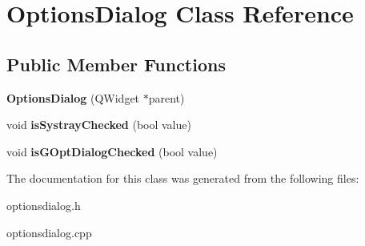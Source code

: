 \hypertarget{classOptionsDialog}{
\section{OptionsDialog Class Reference}
\label{classOptionsDialog}
}
\subsection*{Public Member Functions}
\begin{DoxyCompactItemize}
\item 
\hypertarget{classOptionsDialog_a8131b615e29560144ffb368b9b07060a}{
{\bfseries OptionsDialog} (QWidget $\ast$parent)}
\label{classOptionsDialog_a8131b615e29560144ffb368b9b07060a}

\item 
\hypertarget{classOptionsDialog_af5765aa8cdf4e15439c63e3e746772fb}{
void {\bfseries isSystrayChecked} (bool value)}
\label{classOptionsDialog_af5765aa8cdf4e15439c63e3e746772fb}

\item 
\hypertarget{classOptionsDialog_af04b3c04e935e757307993b7cb4c5fd5}{
void {\bfseries isGOptDialogChecked} (bool value)}
\label{classOptionsDialog_af04b3c04e935e757307993b7cb4c5fd5}

\end{DoxyCompactItemize}


The documentation for this class was generated from the following files:\begin{DoxyCompactItemize}
\item 
optionsdialog.h\item 
optionsdialog.cpp\end{DoxyCompactItemize}
